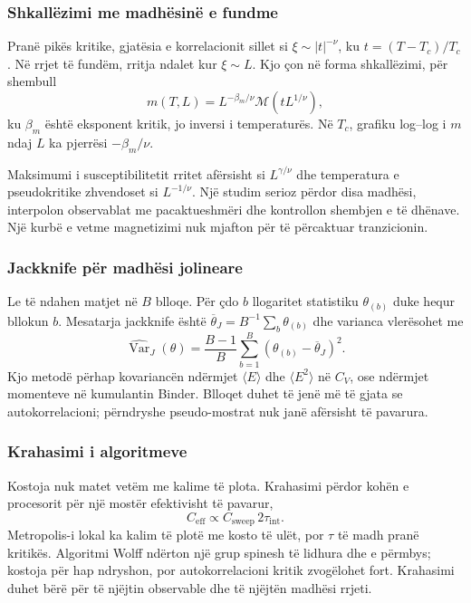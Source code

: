 \documentclass[11pt,oneside,openany]{book}
\newcommand{\Var}{\operatorname{Var}}
\begin{document}
\subsubsection{Shkallëzimi me madhësinë e fundme}
Pranë pikës kritike, gjatësia e korrelacionit sillet si $\xi\sim|t|^{-\nu}$, ku $t=(T-T_c)/T_c$. Në rrjet të fundëm, rritja ndalet kur $\xi\sim L$. Kjo çon në forma shkallëzimi, për shembull
\begin{equation}
 m(T,L)=L^{-\beta_m/\nu}\mathcal M(tL^{1/\nu}),
\end{equation}
ku $\beta_m$ është eksponent kritik, jo inversi i temperaturës. Në $T_c$, grafiku log--log i $m$ ndaj $L$ ka pjerrësi $-\beta_m/\nu$.

Maksimumi i susceptibilitetit rritet afërsisht si $L^{\gamma/\nu}$ dhe temperatura e pseudokritike zhvendoset si $L^{-1/\nu}$. Një studim serioz përdor disa madhësi, interpolon observablat me pacaktueshmëri dhe kontrollon shembjen e të dhënave. Një kurbë e vetme magnetizimi nuk mjafton për të përcaktuar tranzicionin.

\subsubsection{Jackknife për madhësi jolineare}
Le të ndahen matjet në $B$ blloqe. Për çdo $b$ llogaritet statistiku $\theta_{(b)}$ duke hequr bllokun $b$. Mesatarja jackknife është $\overline\theta_J=B^{-1}\sum_b\theta_{(b)}$ dhe varianca vlerësohet me
\begin{equation}
 \widehat{\Var}_J(\theta)=\frac{B-1}{B}
 \sum_{b=1}^{B}(\theta_{(b)}-\overline\theta_J)^2.
\end{equation}
Kjo metodë përhap kovariancën ndërmjet $\langle E\rangle$ dhe $\langle E^2\rangle$ në $C_V$, ose ndërmjet momenteve në kumulantin Binder. Blloqet duhet të jenë më të gjata se autokorrelacioni; përndryshe pseudo-mostrat nuk janë afërsisht të pavarura.

\subsubsection{Krahasimi i algoritmeve}
Kostoja nuk matet vetëm me kalime të plota. Krahasimi përdor kohën e procesorit për një mostër efektivisht të pavarur,
\begin{equation}
 C_{\mathrm{eff}}\propto C_{\mathrm{sweep}}\,2\tau_{\mathrm{int}}.
\end{equation}
Metropolis-i lokal ka kalim të plotë me kosto të ulët, por $\tau$ të madh pranë kritikës. Algoritmi Wolff ndërton një grup spinesh të lidhura dhe e përmbys; kostoja për hap ndryshon, por autokorrelacioni kritik zvogëlohet fort. Krahasimi duhet bërë për të njëjtin observable dhe të njëjtën madhësi rrjeti.
\end{document}
